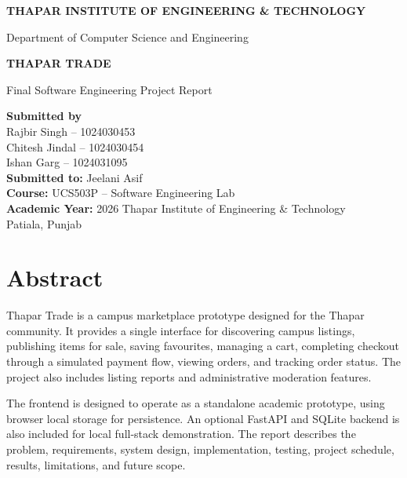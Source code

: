 \documentclass[12pt,a4paper]{report}
\begin{document}
\begin{titlepage}
    \centering
    \vspace*{1cm}
    {\Large\bfseries THAPAR INSTITUTE OF ENGINEERING \& TECHNOLOGY\par}
    \vspace{0.4cm}
    {\large Department of Computer Science and Engineering\par}
    \vspace{1.8cm}
    {\Huge\bfseries THAPAR TRADE\par}
    \vspace{0.5cm}
    {\Large Final Software Engineering Project Report\par}
    \vspace{1.8cm}
    \textbf{Submitted by}\\[0.5cm]
    Rajbir Singh -- 1024030453\\
    Chitesh Jindal -- 1024030454\\
    Ishan Garg -- 1024031095\\[1.3cm]
    \textbf{Submitted to:} Jeelani Asif\\[0.5cm]
    \textbf{Course:} UCS503P -- Software Engineering Lab\\[0.3cm]
    \textbf{Academic Year:} 2026
    \vfill
    Thapar Institute of Engineering \& Technology\\
    Patiala, Punjab
\end{titlepage}


\chapter*{Abstract}
Thapar Trade is a campus marketplace prototype designed for the Thapar community.
It provides a single interface for discovering campus listings, publishing items
for sale, saving favourites, managing a cart, completing checkout through a
simulated payment flow, viewing orders, and tracking order status. The project
also includes listing reports and administrative moderation features.

The frontend is designed to operate as a standalone academic prototype, using
browser local storage for persistence. An optional FastAPI and SQLite backend is
also included for local full-stack demonstration. The report describes the
problem, requirements, system design, implementation, testing, project schedule,
results, limitations, and future scope.
\end{document}
